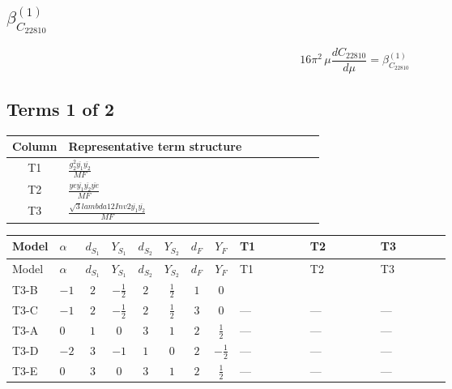 \documentclass[8pt]{article}
\begin{document}
\begin{landscape}
\section*{$\beta_{C_{22810}}^{(1)}$}
\[16\pi^2\,\mu\frac{d C_{22810}}{d\mu}=\beta_{C_{22810}}^{(1)}\]
\subsection*{Terms 1 of 2}
\begin{center}
\begin{tabular}{@{}c >{\raggedright\arraybackslash}p{0.82\linewidth}@{}}
\toprule
Column & Representative term structure \\
\midrule
T1 & \(\displaystyle \frac{g_{2}^{2} \overline{y_{1}} \overline{y_{2}}}{MF}\) \\
\midrule
T2 & \(\displaystyle \frac{ye \overline{y_{1}} \overline{y_{2}} \overline{ye}}{MF}\) \\
\midrule
T3 & \(\displaystyle \frac{\sqrt{3} lambda12Inv2 \overline{y_{1}} \overline{y_{2}}}{MF}\) \\
\midrule
\bottomrule
\end{tabular}
\end{center}
\smallskip
\tiny
\begin{longtable}{@{}llcccccc >{\raggedright\arraybackslash}p{0.21\linewidth} >{\raggedright\arraybackslash}p{0.21\linewidth} >{\raggedright\arraybackslash}p{0.21\linewidth}@{}}
\toprule
Model & $\alpha$ & $d_{S_1}$ & $Y_{S_1}$ & $d_{S_2}$ & $Y_{S_2}$ & $d_F$ & $Y_F$ & T1 & T2 & T3 \\
\midrule
\endfirsthead
\toprule
Model & $\alpha$ & $d_{S_1}$ & $Y_{S_1}$ & $d_{S_2}$ & $Y_{S_2}$ & $d_F$ & $Y_F$ & T1 & T2 & T3 \\
\midrule
\endhead
T3-B & $-1$ & $2$ & $-\frac{1}{2}$ & $2$ & $\frac{1}{2}$ & $1$ & $0$ & \scriptsize\adjustbox{max width=\linewidth}{$\begin{gathered} \frac{3 g_{2}^{2} \overline{y_{1}} \overline{y_{2}}}{4 MF}\end{gathered}$} & \scriptsize\adjustbox{max width=\linewidth}{$\begin{gathered} - \frac{ye \overline{y_{1}} \overline{y_{2}} \overline{ye}}{4 MF}\end{gathered}$} & \scriptsize\adjustbox{max width=\linewidth}{$\begin{gathered} \frac{\sqrt{3} lambda12Inv2 \overline{y_{1}} \overline{y_{2}}}{3 MF}\end{gathered}$} \\
\midrule
T3-C & $-1$ & $2$ & $-\frac{1}{2}$ & $2$ & $\frac{1}{2}$ & $3$ & $0$ & --- & --- & --- \\
\midrule
T3-A & $0$ & $1$ & $0$ & $3$ & $1$ & $2$ & $\frac{1}{2}$ & --- & --- & --- \\
\midrule
T3-D & $-2$ & $3$ & $-1$ & $1$ & $0$ & $2$ & $-\frac{1}{2}$ & --- & --- & --- \\
\midrule
T3-E & $0$ & $3$ & $0$ & $3$ & $1$ & $2$ & $\frac{1}{2}$ & --- & --- & --- \\
\midrule
\bottomrule
\end{longtable}
\clearpage

\end{landscape}
\end{document}
